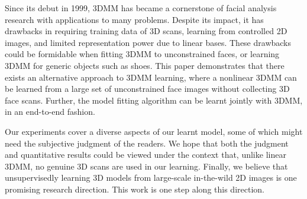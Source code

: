 \label{sec:con}

Since its debut in 1999, 3DMM has became a cornerstone of facial analysis research %
with applications to many problems.
Despite its impact, it has drawbacks in requiring training data of 3D scans, learning from controlled 2D images, and limited representation power due to linear bases. %
These drawbacks could be formidable when fitting 3DMM to unconstrained faces, or learning 3DMM for generic objects such as shoes.
This paper demonstrates that there exists an alternative approach to 3DMM learning, where a nonlinear 3DMM can be learned from a large set of unconstrained face images without collecting 3D face scans.
Further, the model fitting algorithm can be learnt jointly with 3DMM, in an end-to-end fashion.

Our experiments cover a diverse aspects of our learnt model, some of which might need the subjective judgment of the readers.
We hope that both the judgment and quantitative results could be viewed under the context that, unlike linear 3DMM, no genuine 3D scans are used in our learning.
Finally, we believe that unsupervisedly learning 3D models from large-scale in-the-wild 2D images is one promising research direction. 
This work is one step along this direction.
